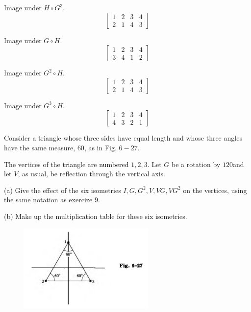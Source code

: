 Image under $H \circ G^3$.
\[
\begin{bmatrix}
1 & 2 & 3 & 4 \\
2 & 1 & 4 & 3
\end{bmatrix}
\]

Image under $G \circ H$.
\[
\begin{bmatrix}
1 & 2 & 3 & 4 \\
3 & 4 & 1 & 2
\end{bmatrix}
\]

Image under $G^2 \circ H$.
\[
\begin{bmatrix}
1 & 2 & 3 & 4 \\
2 & 1 & 4 & 3
\end{bmatrix}
\]

Image under $G^3 \circ H$.
\[
\begin{bmatrix}
1 & 2 & 3 & 4 \\
4 & 3 & 2 & 1
\end{bmatrix}
\]

\begin{tcolorbox}[title=Problem 13, breakable]
    Consider a triangle  whose three sides have equal length
    and whose three angles have the same measure, $60$\textdegree,
    as in Fig. $6-27$.

    The vertices of the triangle are numbered $1, 2, 3$.
    Let $G$ be a rotation by $120$\textdegree and let $V$,
    as usual, be reflection through the vertical axis.
    
    (a) Give the effect of the six isometries $I, G, G^2, V, VG, VG^2$
    on the vertices, using the same notation as exercize $9$.

    (b) Make up the multiplication table for these six isometries.
\end{tcolorbox}

\begin{figure}[h]
    \centering
    \includegraphics[width=0.6\textwidth]{images/triangle.png}
\end{figure}

